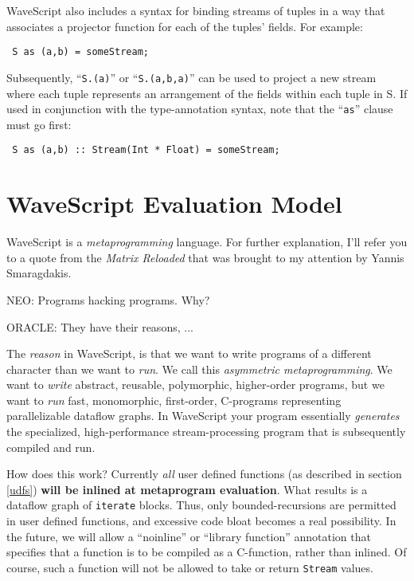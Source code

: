 \documentclass[twocolumn]{report}
\newenvironment{wscode}{\begin{center}\tt}{\end{center}}
\begin{document}
WaveScript also includes a syntax for binding streams of tuples in a
 way that associates a projector function for each of
the tuples' fields.  For example:

\begin{wscode}
S as (a,b) = someStream;
\end{wscode}

Subsequently, ``{\tt S.(a)}'' or ``{\tt S.(a,b,a)}'' can be used to
project a new stream where each tuple represents an arrangement of
the fields within each tuple in {S}.  If used in conjunction with the
type-annotation syntax, note that the ``{\tt as}'' clause must go first:

\begin{wscode}
S as (a,b) :: Stream(Int * Float) = someStream;
\end{wscode}






\chapter{WaveScript Evaluation Model}

WaveScript is a {\em metaprogramming} language.  For further
explanation, I'll refer you to a quote from the {\em Matrix Reloaded}
that was brought to my attention by Yannis Smaragdakis.

\begin{center}
NEO: Programs hacking programs. Why?

ORACLE: They have their reasons, ...
\end{center}

The {\em reason} in WaveScript, is that we want to write programs of a
different character than we want to {\em run}.  We call this {\em asymmetric metaprogramming}.
We want to {\em write}
abstract, reusable, polymorphic, higher-order programs, but we want to
{\em run} fast, monomorphic, first-order, C-programs representing
parallelizable dataflow graphs.
In WaveScript your program essentially {\em
generates} the specialized, high-performance stream-processing
program that is subsequently compiled and run.  


How does this work?  Currently {\em all} user defined functions (as
described in section \ref{udfs}) {\bf will be inlined at metaprogram
evaluation}.  What results is a dataflow graph of {\tt iterate} blocks.
Thus, only bounded-recursions are permitted in user defined functions,
and excessive code bloat becomes a real possibility.  In the future, we will
allow a ``noinline'' or ``library function'' annotation that specifies
that a function is to be compiled as a C-function, rather than
inlined.  Of course, such a function will not be allowed to take or
return {\tt Stream} values.
\end{document}
